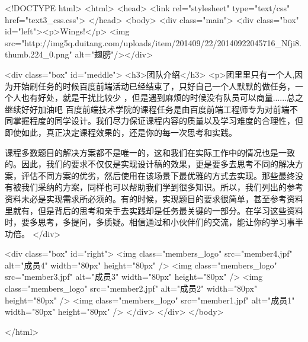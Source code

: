 <!DOCTYPE html>
<html>
<head>
    <link rel="stylesheet" type="text/css" href="text3_css.css">
</head>
<body>
    <div class="main">
    <div class="box" id="left"><p>Wings!</p>
	<img src="http://img5q.duitang.com/uploads/item/201409/22/20140922045716_Nfji8.thumb.224_0.png" alt="翅膀"/></div>
    
	<div class="box" id="meddle">
	<h3>团队介绍</h3>
	<p>团里里只有一个人,因为开始刷任务的时候百度前端活动已经结束了，只好自己一个人默默的做任务，一个人也有好处，就是干扰比较少
	   ，但是遇到麻烦的时候没有队员可以商量......总之继续好好加油吧
	   百度前端技术学院的课程任务是由百度前端工程师专为对前端不同掌握程度的同学设计。我们尽力保证课程内容的质量以及学习难度的合理性，但即使如此，真正决定课程效果的，还是你的每一次思考和实践。

课程多数题目的解决方案都不是唯一的，这和我们在实际工作中的情况也是一致的。因此，我们的要求不仅仅是实现设计稿的效果，更是要多去思考不同的解决方案，评估不同方案的优劣，然后使用在该场景下最优雅的方式去实现。那些最终没有被我们采纳的方案，同样也可以帮助我们学到很多知识。所以，我们列出的参考资料未必是实现需求所必须的。有的时候，实现题目的要求很简单，甚至参考资料里就有，但是背后的思考和亲手去实践却是任务最关键的一部分。在学习这些资料时，要多思考，多提问，多质疑。相信通过和小伙伴们的交流，能让你的学习事半功倍。
	</div>
	
    <div class="box" id="right">
	<img class="members_logo" src="member4.jpf" alt="成员4" width="80px" height="80px"	/>
	<img class="members_logo" src="member3.jpf" alt="成员3" width="80px" height="80px"	/>
	<img class="members_logo" src="member2.jpf" alt="成员2" width="80px" height="80px"	/>
	<img class="members_logo" src="member1.jpf" alt="成员1" width="80px" height="80px"	/>
	</div>
    </div>
</body>




</html>